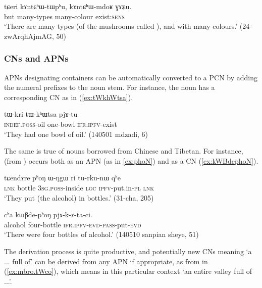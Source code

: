 \begin{exe}
\ex \label{ex:kAntChWmdoR}
\gll  tɕeri kɤntɕʰɯ-tɯpʰu, kɤntɕʰɯ-mdoʁ ɣɤʑu. \\
 but many-types many-colour exist:\textsc{sens} \\
\glt  `There are many types (of the mushrooms called ), and with many colours.' (24-zwArqhAjmAG, 50)
\end{exe}

\subsubsection{CNs and APNs}   \label{sec:CN.APN}
APNs designating containers can be automatically converted to a PCN by adding the numeral prefixes to the noun stem. For instance, the noun  has a corresponding CN   as in (\ref{ex:tWkhWtsa}).

 \begin{exe}
\ex \label{ex:tWkhWtsa}
\gll tɯ-kri tɯ-kʰɯtsa pjɤ-tu \\
\textsc{indef}.\textsc{poss}-oil  one-bowl \textsc{ifr}.\textsc{ipfv}-exist \\
\glt `They had one bowl of oil.' (140501 mdzadi, 6)
\end{exe}

The same is true of nouns borrowed from Chinese and Tibetan. For instance,  (from ) occurs both as an APN (as in \ref{ex:phoN}) and as a CN (\ref{ex:kWBdephoN}).

\begin{exe}
\ex \label{ex:phoN}
\gll  tɕendɤre pʰoŋ ɯ-ŋgɯ ri tu-rku-nɯ qʰe \\
\textsc{lnk} bottle \textsc{3sg}.\textsc{poss}-inside \textsc{loc} \textsc{ipfv}-put.in-\textsc{pl} \textsc{lnk} \\
\glt `They put (the alcohol) in bottles.' (31-cha, 205)
\end{exe}

\begin{exe}
\ex \label{ex:kWBdephoN}
\gll cʰa kɯβde-pʰoŋ pjɤ-k-ɤ-ta-ci. \\
alcohol four-bottle \textsc{ifr}.\textsc{ipfv}-\textsc{evd}-\textsc{pass}-put-\textsc{evd} \\
\glt  `There were four bottles of alcohol.' (140510 sanpian sheye, 51)
\end{exe}

The derivation process is quite productive, and potentially new CNs meaning `a ... full of' can be derived from any APN if appropriate, as  from  in (\ref{ex:mbro.tWco}), which means in this particular context `an entire valley full of ...'.
 

